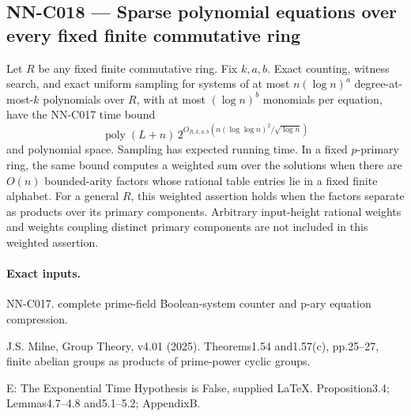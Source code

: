 \subsection{NN-C018 --- Sparse polynomial equations over every fixed finite commutative ring}
\begin{proposition}[NN-C018]
Let $R$ be any fixed finite commutative ring. Fix $k,a,b$. Exact counting, witness search, and exact uniform sampling for systems of at most $n(\log n)^a$ degree-at-most-$k$ polynomials over $R$, with at most $(\log n)^b$ monomials per equation, have the NN-C017 time bound
\[
 \operatorname{poly}(L+n)\,
 2^{O_{R,k,a,b}(n(\log\log n)^2/\sqrt{\log n})}
\]
and polynomial space. Sampling has expected running time. In a fixed $p$-primary ring, the same bound computes a weighted sum over the solutions when there are $O(n)$ bounded-arity factors whose rational table entries lie in a fixed finite alphabet. For a general $R$, this weighted assertion holds when the factors separate as products over its primary components. Arbitrary input-height rational weights and weights coupling distinct primary components are not included in this weighted assertion.
\end{proposition}
\paragraph{Exact inputs.}
NN-C017. complete prime-field Boolean-system counter and p-ary equation compression.

J.S. Milne, Group Theory, v4.01 (2025). Theorems1.54 and1.57(c), pp.25--27, finite abelian groups as products of prime-power cyclic groups.

E: The Exponential Time Hypothesis is False, supplied LaTeX. Proposition3.4; Lemmas4.7--4.8 and5.1--5.2; AppendixB.

